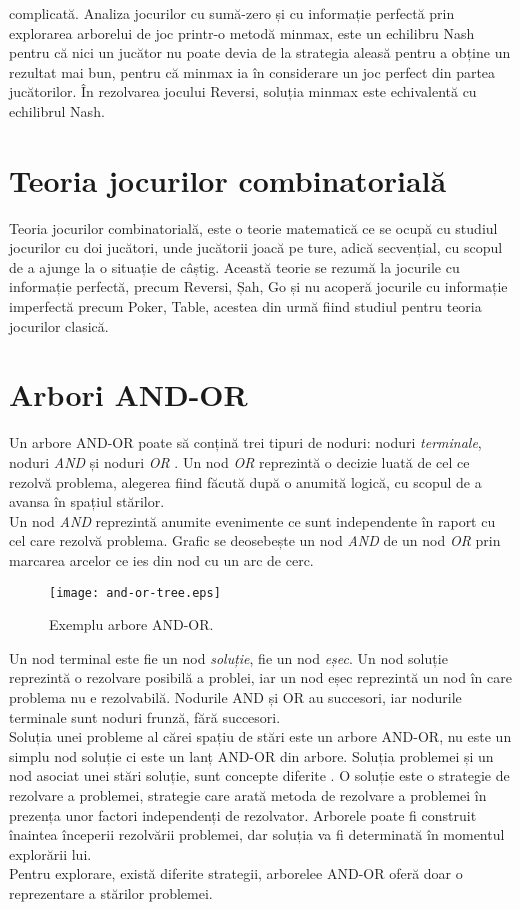 \documentclass[12pt,twoside,a4paper,fleqn]{book}
\theoremstyle{definition}
\begin{document}
complicată. Analiza jocurilor cu sumă-zero și cu informație perfectă prin explorarea arborelui de joc printr-o metodă minmax, este un echilibru Nash pentru că nici un jucător nu poate devia de la strategia aleasă pentru a obține un rezultat mai bun, pentru că minmax ia în considerare un joc perfect din partea jucătorilor. În rezolvarea jocului Reversi, soluția minmax este echivalentă cu echilibrul Nash.\cite{Shoham, turocy, osborne}

\section{Teoria jocurilor combinatorială}
Teoria jocurilor combinatorială, este o teorie matematică ce se ocupă cu studiul jocurilor cu doi jucători, unde jucătorii joacă pe ture, adică secvențial, cu scopul de a ajunge la o situație de câștig. Această teorie se rezumă la jocurile cu informație perfectă, precum Reversi, Șah, Go și nu acoperă jocurile cu informație imperfectă precum Poker, Table, acestea din urmă fiind studiul pentru teoria jocurilor clasică.


\section{Arbori AND-OR}
Un arbore AND-OR poate să conțină trei tipuri de noduri: noduri \emph{terminale}, noduri \emph{AND} și noduri \emph{OR} \cite{Giumale}. Un nod \emph{OR} reprezintă o decizie luată de cel ce rezolvă problema, alegerea fiind făcută după o anumită logică, cu scopul de a avansa în spațiul stărilor.\\
Un nod \emph{AND} reprezintă anumite evenimente ce sunt independente în raport cu cel care rezolvă problema. Grafic se deosebește un nod \emph{AND} de un nod \emph{OR} prin marcarea arcelor ce ies din nod cu un arc de cerc.

\begin{figure}[h]
\begin{center}
\texttt{[image: and-or-tree.eps]}
\caption{\small{Exemplu arbore AND-OR.}}
\label{fig:and_or_tree}
\end{center}
\end{figure}

Un nod terminal este fie un nod \emph{soluție}, fie un nod \emph{eșec}. Un nod soluție reprezintă o rezolvare posibilă a problei, iar un nod eșec reprezintă un nod în care problema nu e rezolvabilă. Nodurile AND și OR au succesori, iar nodurile terminale sunt noduri frunză, fără succesori.\\
Soluția unei probleme al cărei spațiu de stări este un arbore AND-OR, nu este un simplu nod soluție ci este un lanț AND-OR din arbore. Soluția problemei și un nod asociat unei stări soluție, sunt concepte diferite \cite{Giumale}. O soluție este o strategie de rezolvare a problemei, strategie care arată metoda de rezolvare a problemei în prezența unor factori independenți de rezolvator. Arborele poate fi construit înaintea începerii rezolvării problemei, dar soluția va fi determinată în momentul explorării lui.\\
Pentru explorare, există diferite strategii, arborelee AND-OR oferă doar o reprezentare a stărilor problemei.
\end{document}
